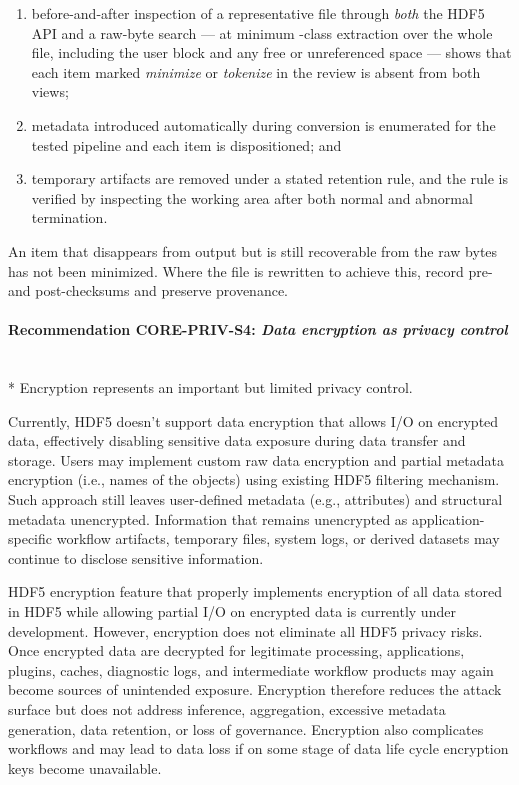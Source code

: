 \documentclass[../main.tex]{subfiles}
\begin{document}
\begin{enumerate}[label=(\alph*),leftmargin=2em]
    \item before-and-after inspection of a representative file through
          \emph{both} the HDF5 API and a raw-byte search --- at minimum
          -class extraction over the whole file, including the
          user block and any free or unreferenced space --- shows that each
          item marked \emph{minimize} or \emph{tokenize} in the
           review is absent from both views;
    \item metadata introduced automatically during conversion is enumerated
          for the tested pipeline and each item is dispositioned; and
    \item temporary artifacts are removed under a stated retention rule, and
          the rule is verified by inspecting the working area after both
          normal and abnormal termination.
\end{enumerate}

An item that disappears from  output but is still recoverable
from the raw bytes has not been minimized. Where the file is rewritten to
achieve this, record pre- and post-checksums and preserve provenance.

\paragraph{Recommendation CORE-PRIV-S4: \emph{Data encryption as privacy control}}\mbox{}\\*
Encryption represents an important but limited privacy control. 

Currently, HDF5 doesn’t support data encryption that allows I/O on encrypted 
data, effectively disabling sensitive data exposure during data 
transfer and storage. Users may implement custom raw data encryption 
and partial metadata encryption (i.e., names of the objects) using 
existing HDF5 filtering mechanism. Such approach still leaves user-defined 
metadata (e.g., attributes) and structural metadata unencrypted. Information 
that remains unencrypted as application-specific workflow artifacts, 
temporary files, system logs, or derived datasets may continue to 
disclose sensitive information.
  
HDF5 encryption feature that properly implements encryption of all data 
stored in HDF5 while allowing partial I/O on encrypted data is currently 
under development. However, encryption does not eliminate all HDF5 privacy risks. 
Once encrypted data are decrypted for legitimate processing, applications, 
plugins, caches, diagnostic logs, and intermediate workflow products may again 
become sources of unintended exposure. Encryption therefore reduces the attack 
surface but does not address inference, aggregation, excessive metadata 
generation, data retention, or loss of governance. Encryption also complicates 
workflows and may lead to data loss if on some stage of data life cycle 
encryption keys become unavailable.
\end{document}

